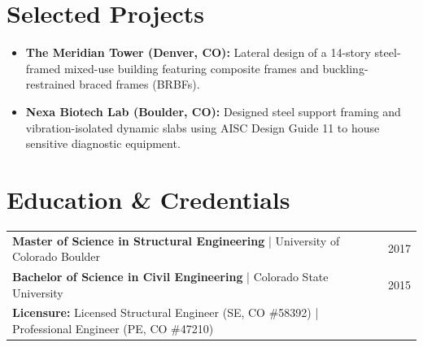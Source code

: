 \documentclass[10pt]{article}
\begin{document}
\vspace{4pt}

\section*{Selected Projects}
\begin{itemize}
    \item {\bfseries The Meridian Tower (Denver, CO):} Lateral design of a 14-story steel-framed mixed-use building featuring composite frames and buckling-restrained braced frames (BRBFs).
    \item {\bfseries Nexa Biotech Lab (Boulder, CO):} Designed steel support framing and vibration-isolated dynamic slabs using AISC Design Guide 11 to house sensitive diagnostic equipment.
\end{itemize}

\vspace{4pt}

\section*{Education \& Credentials}
\noindent
\begin{tabularx}{\textwidth}{@{} X r @{}}
    {\bfseries Master of Science in Structural Engineering} \quad | \quad University of Colorado Boulder & 2017 \\
    {\bfseries Bachelor of Science in Civil Engineering} \quad | \quad Colorado State University & 2015 \\
    {\bfseries Licensure:} Licensed Structural Engineer (SE, CO \#58392) \quad | \quad Professional Engineer (PE, CO \#47210) & \\
\end{tabularx}
\end{document}
